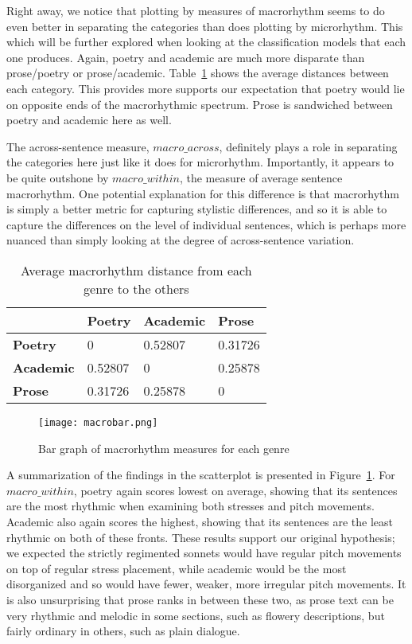 \documentclass[pageno]{jpaper}
\begin{document}
Right away, we notice that plotting by measures of macrorhythm seems to do even better in separating the categories than does plotting by microrhythm. This which will be further explored when looking at the classification models that each one produces. 
Again, poetry and academic are much more disparate than prose/poetry or prose/academic. Table~\ref{table:macroresults} shows the average distances between each category. This provides more supports our expectation that poetry would lie on opposite ends of the macrorhythmic spectrum. Prose is sandwiched between poetry and academic here as well.

The across-sentence measure, $macro\_across$, definitely plays a role in separating the categories here just like it does for microrhythm. Importantly, it appears to be quite outshone by $macro\_within$, the measure of average sentence macrorhythm. One potential explanation for this difference is that macrorhythm is simply a better metric for capturing stylistic differences, and so it is able to capture the differences on the level of individual sentences, which is perhaps more nuanced than simply looking at the degree of across-sentence variation.  

\begin{table}[hbt]
  \centering
  \begin{tabular}{l l l l}
    \hline \hline
    &\textbf{Poetry}&\textbf{Academic}&\textbf{Prose} \\ [0.5ex] 
    \hline\hline
    \textbf{Poetry} & 0 & 0.52807 & 0.31726 \\
     \textbf{Academic} & 0.52807 & 0 &  0.25878 \\
     \textbf{Prose} &  0.31726 & 0.25878  & 0 \\
    \hline
  \end{tabular}
  \caption{Average macrorhythm distance from each genre to the others}
  \label{table:macroresults}
\end{table}

\begin{figure}[hbt]
\centering
\texttt{[image: macrobar.png]}
\caption{Bar graph of macrorhythm measures for each genre}
\label{fig:macrobar}
\end{figure}

A summarization of the findings in the scatterplot is presented in Figure~\ref{fig:macrobar}. For $macro\_within$, poetry again scores lowest on average, showing that its sentences are the most rhythmic when examining both stresses and pitch movements. Academic also again scores the highest, showing that its sentences are the least rhythmic on both of these fronts. These results support our original hypothesis; we expected the strictly regimented sonnets would have regular pitch movements on top of regular stress placement, while academic would be the most disorganized and so would have fewer, weaker, more irregular pitch movements. It is also unsurprising that prose ranks in between these two, as prose text can be very rhythmic and melodic in some sections, such as flowery descriptions, but fairly ordinary in others, such as plain dialogue. 
\end{document}
